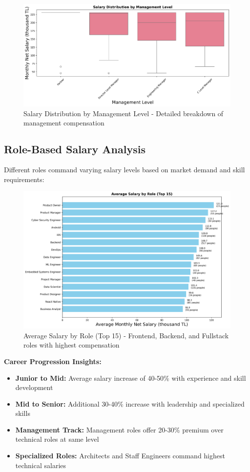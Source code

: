 \documentclass[12pt,a4paper]{article}
\begin{document}
\begin{figure}[H]
    \centering
    \includegraphics[width=\textwidth]{figures/boxplot_management_level.png}
    \caption{Salary Distribution by Management Level - Detailed breakdown of management compensation}
\end{figure}

\subsection{Role-Based Salary Analysis}
Different roles command varying salary levels based on market demand and skill requirements:

\begin{figure}[H]
    \centering
    \includegraphics[width=\textwidth]{figures/barplot_role_salaries.png}
    \caption{Average Salary by Role (Top 15) - Frontend, Backend, and Fullstack roles with highest compensation}
\end{figure}

\textbf{Career Progression Insights:}
\begin{itemize}
    \item \textbf{Junior to Mid:} Average salary increase of 40-50\% with experience and skill development
    \item \textbf{Mid to Senior:} Additional 30-40\% increase with leadership and specialized skills
    \item \textbf{Management Track:} Management roles offer 20-30\% premium over technical roles at same level
    \item \textbf{Specialized Roles:} Architects and Staff Engineers command highest technical salaries
\end{itemize}
\end{document}
